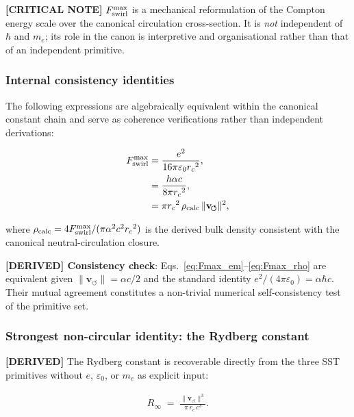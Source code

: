 \documentclass[11pt]{article}
\theoremstyle{definition}
\theoremstyle{plain}
\theoremstyle{remark}
\newcommand{\rc}{{r_c}}
\newcommand{\vnorm}{\lVert \mathbf{v}_{\!\boldsymbol{\circlearrowleft}} \rVert}
\begin{document}
        \textbf{[CRITICAL NOTE]} $F_{\rm swirl}^{\max}$ is a mechanical reformulation of the Compton energy scale over the canonical circulation cross-section. It is \emph{not} independent of $\hbar$ and $m_e$; its role in the canon is interpretive and organisational rather than that of an independent primitive.

        \subsubsection{Internal consistency identities}

        The following expressions are algebraically equivalent within the canonical constant chain and serve as coherence verifications rather than independent derivations:

        \begin{align}
            F_{\rm swirl}^{\max}
            &= \frac{e^2}{16\pi\varepsilon_0 \rc^2},
            \label{eq:Fmax_em}\\
            &= \frac{h\alpha c}{8\pi \rc^2},
            \label{eq:Fmax_hac}\\
            &= \pi \rc^2\,\rho_{\rm calc}\,\vnorm^2,
            \label{eq:Fmax_rho}
        \end{align}

        where $\rho_{\rm calc} = 4F_{\rm swirl}^{\max}/(\pi\alpha^2 c^2 \rc^2)$ is the derived bulk density consistent with the canonical neutral-circulation closure.

        \textbf{[DERIVED] Consistency check}: Eqs.~\eqref{eq:Fmax_em}--\eqref{eq:Fmax_rho} are equivalent given $\vnorm = \alpha c/2$ and the standard identity $e^2/(4\pi\varepsilon_0) = \alpha\hbar c$. Their mutual agreement constitutes a non-trivial numerical self-consistency test of the primitive set.

        \subsubsection{Strongest non-circular identity: the Rydberg constant}

        \textbf{[DERIVED]} The Rydberg constant is recoverable directly from the three SST primitives without $e$, $\varepsilon_0$, or $m_e$ as explicit input:

        \begin{align}
            R_\infty \;=\; \frac{\vnorm^3}{\pi\,\rc\,c^3}.
            \label{eq:Rydberg_SST}
        \end{align}
\end{document}
